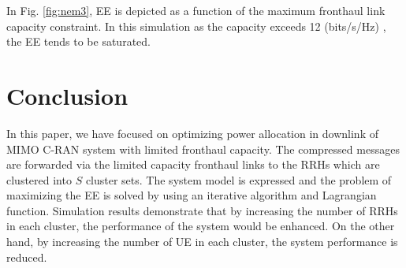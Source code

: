 \documentclass[conference,10pt,twocolumn,letter]{IEEEtran}
\begin{document}
In Fig. \ref{fig:nem3}, EE is depicted as a function of the maximum fronthaul link capacity constraint. In this simulation as the capacity  exceeds 12 (bits/s/Hz) , the EE tends to be saturated.
\section{Conclusion}
In this paper, we have focused on optimizing power allocation in downlink of MIMO C-RAN system with limited fronthaul capacity.
 The compressed messages are forwarded via the limited capacity fronthaul links to the RRHs which are clustered into $S$ cluster sets.
The system model is expressed and the problem of maximizing the EE is solved by using an iterative algorithm and Lagrangian function.
Simulation results demonstrate that by increasing the number of RRHs in each cluster, the performance of the system would be enhanced. 
On the other hand, by increasing the number of UE in each cluster, the system performance is reduced.




\
\end{document}
